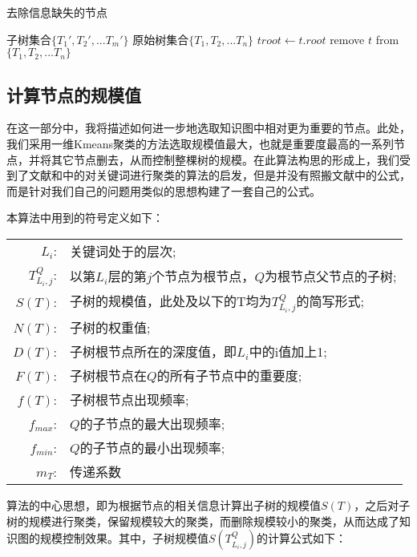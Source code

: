 \begin{algorithm}
\caption{去除信息缺失的节点}
\label{ago1}
\begin{algorithmic}[1] %
\Ensure 子树集合$\{T_1',T_2',...T_m'\}$ %
\Require 原始树集合$\{T_1,T_2,...T_n\}$ %
  \State $troot \gets t.root$
    \State remove $t$ from $\{T_1,T_2,...T_n\}$
  \EndIf
\EndFor
\end{algorithmic}
\end{algorithm}

\subsection{计算节点的规模值}
在这一部分中，我将描述如何进一步地选取知识图中相对更为重要的节点。此处，我们采用一维Kmeans聚类的方法选取规模值最大，也就是重要度最高的一系列节点，并将其它节点删去，从而控制整棵树的规模。在此算法构思的形成上，我们受到了文献和中的对关键词进行聚类的算法的启发，但是并没有照搬文献中的公式，而是针对我们自己的问题用类似的思想构建了一套自己的公式。

本算法中用到的符号定义如下：

\begin{longtable}{rl}
$L_{i}$: 		& 关键词处于的层次; \\
$T_{L_{i},j}^{Q}$:     & 以第$L_{i}$层的第$j$个节点为根节点，$Q$为根节点父节点的子树; \\
$S(T)$:     & 子树的规模值，此处及以下的T均为$T_{L_{i},j}^{Q}$的简写形式; \\
$N(T)$:     & 子树的权重值; \\
$D(T)$:     & 子树根节点所在的深度值，即$L_{i}$中的i值加上1; \\
$F(T)$:     & 子树根节点在$Q$的所有子节点中的重要度; \\
$f(T)$:     & 子树根节点出现频率; \\
$f_{max}$:     & $Q$的子节点的最大出现频率; \\
$f_{min}$:     & $Q$的子节点的最小出现频率; \\
$m_{T}$:     & 传递系数 \\
\end{longtable}

算法的中心思想，即为根据节点的相关信息计算出子树的规模值$S(T)$，之后对子树的规模进行聚类，保留规模较大的聚类，而删除规模较小的聚类，从而达成了知识图的规模控制效果。其中，子树规模值$S(T_{L_{i},j}^{Q})$的计算公式如下：

